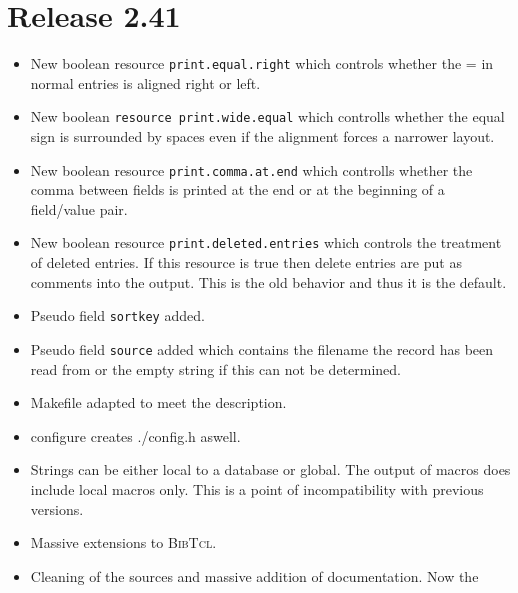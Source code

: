 \documentclass[11pt,a4paper]{scrartcl}
\newcommand\rsc[1]{\texttt{#1}}
\newcommand\File[1]{\textsf{#1}}
\newcommand\BibTcl{\textsc{BibTcl}}
\newenvironment{Release}[2]{\section*{Release #1}\begin{itemize}}{\end{itemize}}
\newenvironment{Fix}[1]{\item }{}
\newenvironment{New}[1]{\item }{}
\newenvironment{Doc}[1]{\item }{}
\begin{document}
 \begin{Release}{2.41}{}
  \begin{New}{gene}
    New boolean resource \rsc{print.equal.right} which controls whether
    the = in normal entries is aligned right or left.
  \end{New}
  \begin{New}{gene}
    New boolean \rsc{resource print.wide.equal} which controlls whether
    the equal sign is surrounded by spaces even if the alignment forces a
    narrower layout.
  \end{New}
  \begin{New}{gene}
    New boolean resource \rsc{print.comma.at.end} which controlls
    whether the comma between fields is printed at the end or at the beginning
    of a field/value pair.
  \end{New}
  \begin{New}{gene}
    New boolean resource \rsc{print.deleted.entries} which controls the
    treatment of deleted entries. If this resource is true then delete entries
    are put as comments into the output. This is the old behavior and thus it
    is the default.
  \end{New}
  \begin{New}{gene}
    Pseudo field \rsc{sortkey} added.
  \end{New}
  \begin{New}{gene}
    Pseudo field \rsc{source} added which contains the filename the
    record has been read from or the empty string if this can not be
    determined.
  \end{New}
  \begin{Fix}{gene}
    Makefile adapted to meet the description.
  \end{Fix}
  \begin{New}{gene}
	configure creates \File{./config.h} aswell.
  \end{New}
  \begin{New}{gene}
    Strings can be either local to a database or global. The output of macros
    does include local macros only. This is a point of incompatibility with
    previous versions.
  \end{New}
  \begin{New}{gene}
    Massive extensions to \BibTcl.
  \end{New}
  \begin{Doc}{gene}
    Cleaning of the sources and massive addition of documentation. Now the

\end{Doc}
\end{Release}
\end{document}
